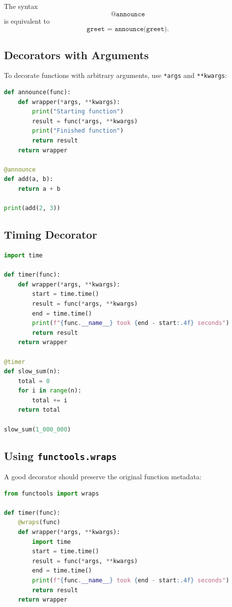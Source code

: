 \documentclass[12pt,oneside]{book}
\numberwithin{equation}{section}
\theoremstyle{definition}
\theoremstyle{plain}
\theoremstyle{remark}
\begin{document}
The syntax
\[
\texttt{@announce}
\]
is equivalent to
\[
\texttt{greet = announce(greet)}.
\]

\subsection{Decorators with Arguments}

To decorate functions with arbitrary arguments, use \texttt{*args} and \texttt{**kwargs}:
\begin{lstlisting}[language=Python]
def announce(func):
    def wrapper(*args, **kwargs):
        print("Starting function")
        result = func(*args, **kwargs)
        print("Finished function")
        return result
    return wrapper

@announce
def add(a, b):
    return a + b

print(add(2, 3))
\end{lstlisting}

\subsection{Timing Decorator}

\begin{lstlisting}[language=Python]
import time

def timer(func):
    def wrapper(*args, **kwargs):
        start = time.time()
        result = func(*args, **kwargs)
        end = time.time()
        print(f"{func.__name__} took {end - start:.4f} seconds")
        return result
    return wrapper

@timer
def slow_sum(n):
    total = 0
    for i in range(n):
        total += i
    return total

slow_sum(1_000_000)
\end{lstlisting}

\subsection{Using \texttt{functools.wraps}}

A good decorator should preserve the original function metadata:
\begin{lstlisting}[language=Python]
from functools import wraps

def timer(func):
    @wraps(func)
    def wrapper(*args, **kwargs):
        import time
        start = time.time()
        result = func(*args, **kwargs)
        end = time.time()
        print(f"{func.__name__} took {end - start:.4f} seconds")
        return result
    return wrapper
\end{lstlisting}
\end{document}
